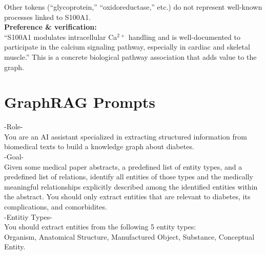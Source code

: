\documentclass[10pt]{article}
\begin{document}
\begin{appendices}
\begin{tcolorbox}
Other tokens (``glycoprotein,'' ``oxidoreductase,'' etc.) do not represent well-known processes linked to S100A1.\\

\noindent \textbf{Preference \& verification:}\\
``S100A1 modulates intracellular Ca$^{2+}$ handling and is well-documented to participate in the calcium signaling pathway, especially in cardiac and skeletal muscle.'' This is a concrete biological pathway association that adds value to the graph.

\end{tcolorbox}



\clearpage 
\section{GraphRAG Prompts}
\label{app:graphrag_prompts}
\setcounter{table}{0}
\renewcommand{\thetable}{E\arabic{table}}
\setcounter{figure}{0}
\renewcommand{\thetable}{E\arabic{table}}

\begin{tcolorbox}[
    title=E1: GraphRAG Index Prompt,
    halign title=center,
  colback=white,        %
  colframe=blue,       %
  breakable,
  boxrule=0.8pt,        %
  arc=4mm,              %
  left=4pt,             %
  right=4pt,            %
  top=4pt,              %
  bottom=4pt,            %
  fontupper=\small
]
\label{prompt:GraphRAG-index}

-Role-\\
You are an AI assistant specialized in extracting structured information from biomedical texts to build a knowledge graph about diabetes.\\

-Goal-\\
Given some medical paper abstracts, a predefined list of entity types, and a predefined list of relations, identify all entities of those types and the medically meaningful relationships explicitly described among the identified entities within the abstract. You should only extract entities that are relevant to diabetes, its complications, and comorbidites.\\

-Entitiy Types-\\
You should extract entities from the following 5 entity types: \\
Organism, Anatomical Structure, Manufactured Object, Substance, Conceptual Entity.\\ 


\end{tcolorbox}
\end{appendices}
\end{document}
